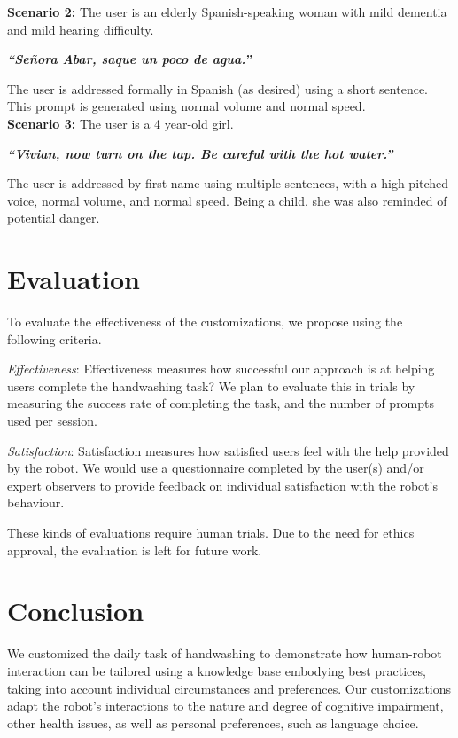 \documentclass[11pt,a4paper, final, twoside]{article}
\theoremstyle{proposition}
\theoremstyle{definition}
\theoremstyle{remark}
\numberwithin{equation}{section}
\begin{document}
{\bf Scenario 2:} The user is an elderly Spanish-speaking woman with mild dementia and mild hearing difficulty.
\begin{center}
\textbf{\textit{``Se\~nora Abar, saque un poco de agua.''}}
\end{center}
%
The user is addressed formally in Spanish (as desired)
using a short sentence.  This prompt is generated using normal volume and normal speed.\\

{\bf Scenario 3:} The user is a 4 year-old girl.
\begin{center}
\textbf{\textit{``Vivian, now turn on the tap. Be careful with the hot water.''}}
\end{center}
The user is addressed by first name using multiple sentences,
with a high-pitched voice, normal volume, and normal speed.
Being a child, she was also reminded of potential danger.


\section{Evaluation}
To evaluate the effectiveness of the customizations, we propose using the following criteria.

\emph{Effectiveness}: Effectiveness measures how successful our approach is at helping users complete the handwashing task? We plan to evaluate this in trials by measuring the success rate of completing the task, and the number of prompts used per session.

\emph{Satisfaction}: Satisfaction measures how satisfied users feel with the help provided by the robot. We would use a questionnaire completed by the user(s) and/or expert observers to provide feedback on individual satisfaction with the robot's behaviour.

These kinds of evaluations require human trials. Due to the need for ethics approval, the evaluation is left for future work.

\section{Conclusion}
We customized the daily task of handwashing to demonstrate how human-robot interaction can be tailored using a knowledge base embodying best practices, taking into account individual circumstances and preferences. Our customizations adapt the robot's interactions to the nature and degree of cognitive impairment, other health issues, as well as personal preferences, such as language choice. 
\end{document}
